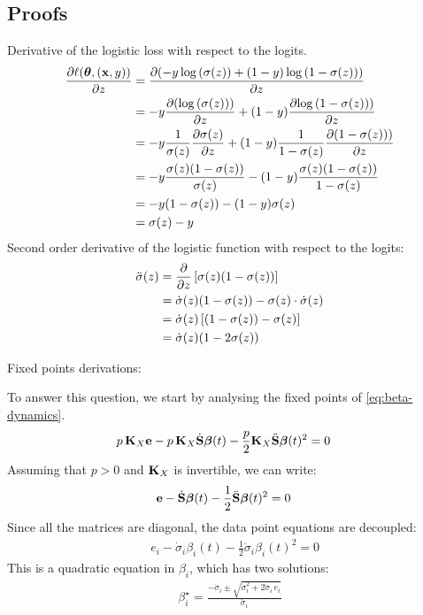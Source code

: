 \documentclass{article} %
\begin{document}
\newpage
\subsection{Proofs}
Derivative of the logistic loss with respect to the logits. 
\begin{align}
    \frac{\partial{\ell(\mbox{$\mbox{$\boldsymbol{\theta}$}$}, (\mbox{$\mbox{$\mathbf{x}$}$},y))}}{\partial{z}} 
    &= \frac{\partial{(-y \log \left(\sigma(z)\right) + (1-y) \log\left(1 - \sigma(z)\right))}}{\partial{z}} \\
    &= -y\frac{\partial{(\log \left(\sigma(z)\right))}}{\partial{z}} + (1-y) \frac{\partial{\log\left(1 - \sigma(z)\right))}}{\partial{z}} \\
    &= -y\frac{1}{\sigma(z)}\frac{\partial{\sigma(z)}}{\partial{z}} + (1-y)\frac{1}{1 - \sigma(z)} \frac{\partial{\left(1 - \sigma(z)\right))}}{\partial{z}} \\
    &= -y\frac{\sigma(z)(1 - \sigma(z))}{\sigma(z)} - (1-y)\frac{\sigma(z)(1 - \sigma(z))}{1 - \sigma(z)} \\
    &= -y(1 - \sigma(z))  - (1-y)\sigma(z)\\
    &= \sigma(z) - y
\end{align}
Second order derivative of the logistic function with respect to the logits: 
\begin{align}
    \ddot\sigma(z) 
    &= \frac{\partial{}}{\partial{z}} \left[ \sigma(z)(1 - \sigma(z)) \right]\\
    &= \dot\sigma(z)(1 - \sigma(z)) - \sigma(z) \cdot \dot\sigma(z)\\
    &= \dot\sigma(z) \left[ (1 - \sigma(z)) - \sigma(z) \right]\\
    &= \dot\sigma(z)(1 - 2\sigma(z))
\end{align}

Fixed points derivations: 

To answer this question, we start by analysing the fixed points of \cref{eq:beta-dynamics}. 
\begin{align}
    & p\,\mbox{$\mbox{$\mathbf{K}$}$}_X\mbox{$\mbox{$\mathbf{e}$}$} - p\,\mbox{$\mbox{$\mathbf{K}$}$}_X \dot{\mbox{$\mbox{$\mathbf{S}$}$}} \mbox{$\mbox{$\boldsymbol{\beta}$}$}(t) - \frac{p}{2}\mbox{$\mbox{$\mathbf{K}$}$}_X\ddot{\mbox{$\mbox{$\mathbf{S}$}$}} \mbox{$\mbox{$\boldsymbol{\beta}$}$}(t)^2 = 0
\end{align}
Assuming that $p > 0$ and $\mbox{$\mbox{$\mathbf{K}$}$}_X$ is invertible, we can  write: 
\begin{align}
    & \mbox{$\mbox{$\mathbf{e}$}$} - \dot{\mbox{$\mbox{$\mathbf{S}$}$}} \mbox{$\mbox{$\boldsymbol{\beta}$}$}(t) - \frac{1}{2}\ddot{\mbox{$\mbox{$\mathbf{S}$}$}} \mbox{$\mbox{$\boldsymbol{\beta}$}$}(t)^2 = 0
\end{align}
Since all the matrices are diagonal, the data  point equations are decoupled:
\begin{align}
    & e_i - \dot\sigma_i \beta_i(t) - \frac{1}{2}\ddot\sigma_i \beta_i(t)^2 = 0
\end{align}
This is a quadratic equation in $\beta_i$, which has two solutions:
\begin{align}
    \beta_i^\star = \frac{-\dot\sigma_i \pm \sqrt{\dot\sigma_i^2 + 2 \ddot\sigma_i\,e_i}}{\ddot\sigma_i}
\end{align}
\end{document}
